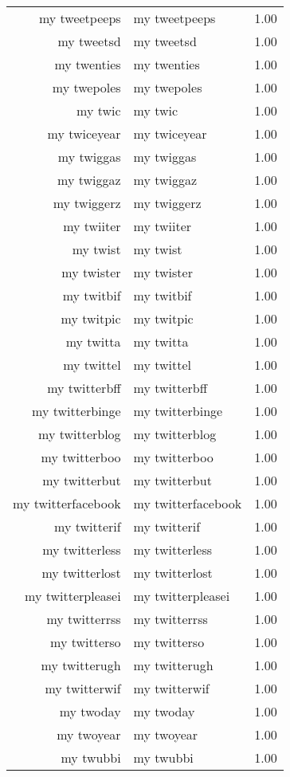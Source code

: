 \begin{table}[ht]
\begin{tabular}{rlr}
  my tweetpeeps & my tweetpeeps & 1.00 \\ 
  my tweetsd & my tweetsd & 1.00 \\ 
  my twenties & my twenties & 1.00 \\ 
  my twepoles & my twepoles & 1.00 \\ 
  my twic & my twic & 1.00 \\ 
  my twiceyear & my twiceyear & 1.00 \\ 
  my twiggas & my twiggas & 1.00 \\ 
  my twiggaz & my twiggaz & 1.00 \\ 
  my twiggerz & my twiggerz & 1.00 \\ 
  my twiiter & my twiiter & 1.00 \\ 
  my twist & my twist & 1.00 \\ 
  my twister & my twister & 1.00 \\ 
  my twitbif & my twitbif & 1.00 \\ 
  my twitpic & my twitpic & 1.00 \\ 
  my twitta & my twitta & 1.00 \\ 
  my twittel & my twittel & 1.00 \\ 
  my twitterbff & my twitterbff & 1.00 \\ 
  my twitterbinge & my twitterbinge & 1.00 \\ 
  my twitterblog & my twitterblog & 1.00 \\ 
  my twitterboo & my twitterboo & 1.00 \\ 
  my twitterbut & my twitterbut & 1.00 \\ 
  my twitterfacebook & my twitterfacebook & 1.00 \\ 
  my twitterif & my twitterif & 1.00 \\ 
  my twitterless & my twitterless & 1.00 \\ 
  my twitterlost & my twitterlost & 1.00 \\ 
  my twitterpleasei & my twitterpleasei & 1.00 \\ 
  my twitterrss & my twitterrss & 1.00 \\ 
  my twitterso & my twitterso & 1.00 \\ 
  my twitterugh & my twitterugh & 1.00 \\ 
  my twitterwif & my twitterwif & 1.00 \\ 
  my twoday & my twoday & 1.00 \\ 
  my twoyear & my twoyear & 1.00 \\ 
  my twubbi & my twubbi & 1.00 \\ 

\end{tabular}
\end{table}
